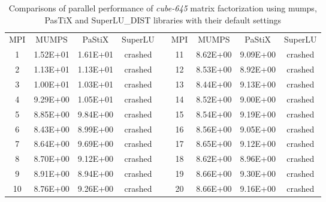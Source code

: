 \begin{table}[ht]
\centering
\begin{tabular}{|c|c|c|c|l|c|c|c|c|}
\cline{1-4} \cline{6-9}
MPI & MUMPS    & PaStiX   & SuperLU &  & MPI & MUMPS    & PaStiX   & SuperLU \\ \cline{1-4} \cline{6-9} 
1   & 1.52E+01 & 1.61E+01 & crashed &  & 11  & 8.62E+00 & 9.09E+00 & crashed \\ \cline{1-4} \cline{6-9} 
2   & 1.13E+01 & 1.13E+01 & crashed &  & 12  & 8.53E+00 & 8.92E+00 & crashed \\ \cline{1-4} \cline{6-9} 
3   & 1.00E+01 & 1.03E+01 & crashed &  & 13  & 8.44E+00 & 9.13E+00 & crashed \\ \cline{1-4} \cline{6-9} 
4   & 9.29E+00 & 1.05E+01 & crashed &  & 14  & 8.52E+00 & 9.00E+00 & crashed \\ \cline{1-4} \cline{6-9} 
5   & 8.85E+00 & 9.84E+00 & crashed &  & 15  & 8.54E+00 & 9.19E+00 & crashed \\ \cline{1-4} \cline{6-9} 
6   & 8.43E+00 & 8.99E+00 & crashed &  & 16  & 8.56E+00 & 9.05E+00 & crashed \\ \cline{1-4} \cline{6-9} 
7   & 8.64E+00 & 9.69E+00 & crashed &  & 17  & 8.65E+00 & 9.12E+00 & crashed \\ \cline{1-4} \cline{6-9} 
8   & 8.70E+00 & 9.12E+00 & crashed &  & 18  & 8.62E+00 & 8.96E+00 & crashed \\ \cline{1-4} \cline{6-9} 
9   & 8.91E+00 & 8.94E+00 & crashed &  & 19  & 8.66E+00 & 9.30E+00 & crashed \\ \cline{1-4} \cline{6-9} 
10  & 8.76E+00 & 9.26E+00 & crashed &  & 20  & 8.66E+00 & 9.16E+00 & crashed \\ \cline{1-4} \cline{6-9} 
\end{tabular}
\caption{Comparisons of parallel performance of  \textit{cube-645} matrix factorization using \acrshort{mumps}, PasTiX and SuperLU\_DIST libraries with their default settings}
\label{table:app-lc-cube-645-result}
\end{table}

\newpage